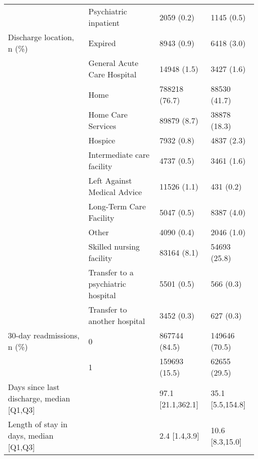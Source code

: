 \begin{tabular}{llll}
                                       & Psychiatric inpatient &                            2059 (0.2) &        1145 (0.5) \\
Discharge location, n (\%) & Expired &                            8943 (0.9) &        6418 (3.0) \\
                                       & General Acute Care Hospital &                           14948 (1.5) &        3427 (1.6) \\
                                       & Home &                         788218 (76.7) &      88530 (41.7) \\
                                       & Home Care Services &                           89879 (8.7) &      38878 (18.3) \\
                                       & Hospice &                            7932 (0.8) &        4837 (2.3) \\
                                       & Intermediate care facility &                            4737 (0.5) &        3461 (1.6) \\
                                       & Left Against Medical Advice &                           11526 (1.1) &         431 (0.2) \\
                                       & Long-Term Care Facility &                            5047 (0.5) &        8387 (4.0) \\
                                       & Other &                            4090 (0.4) &        2046 (1.0) \\
                                       & Skilled nursing facility &                           83164 (8.1) &      54693 (25.8) \\
                                       & Transfer to a psychiatric hospital &                            5501 (0.5) &         566 (0.3) \\
                                       & Transfer to another hospital &                            3452 (0.3) &         627 (0.3) \\
30-day readmissions, n (\%) & 0 &                         867744 (84.5) &     149646 (70.5) \\
                                       & 1 &                         159693 (15.5) &      62655 (29.5) \\
Days since last discharge, median [Q1,Q3] &   &                     97.1 [21.1,362.1] &  35.1 [5.5,154.8] \\
Length of stay in days, median [Q1,Q3] &   &                         2.4 [1.4,3.9] &   10.6 [8.3,15.0] \\
\bottomrule
\end{tabular}

